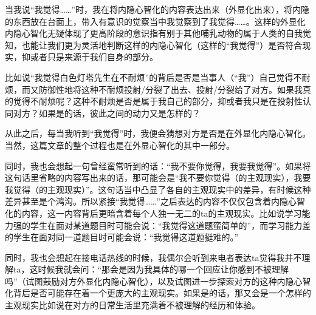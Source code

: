 当我说“我觉得……”时，我在将内隐心智化的内容表达出来（外显化出来），将内隐的东西放在台面上，带入有意识的觉察当中\pozhehao{}我觉察到了我觉得……。这样的外显化内隐心智化无疑体现了更高阶段的意识\pozhehao{}指有别于其他哺乳动物的属于人类的自我觉知，也能让我们更为灵活地判断这样的内隐心智化（这样的“我觉得”）是否符合现实，抑或者只是来源于我们自身的部分。

比如说“我觉得白色灯塔先生在不耐烦”的背后是否是当事人（“我”）自己觉得不耐烦，而又防御性地将这种不耐烦投射/分裂了出去、投射/分裂给了对方。如果我真的觉得不耐烦呢？这种不耐烦是否是属于我自己的部分，抑或者我只是在投射性认同对方？如果是的话，彼此之间的动力又是怎样的？

从此之后，每当我听到“我觉得”时，我便会猜想对方是否是在外显化内隐心智化。当然，这篇文章的整个过程也是在外显心智化的其中一部分。

同时，我也会想起一句曾经蛮常听到的话：“我不要你觉得，我要我觉得”。如果将这句话里省略的内容写出来的话，那可能会是“我不要你觉得（的主观现实），我要我觉得（的主观现实）”。这句话当中凸显了各自的主观现实中的差异，有时候这种差异甚至是个鸿沟。所以紧接“我觉得……”之后表达的内容不仅仅包含着内隐心智化的内容，这一内容背后更暗含着每个人独一无二的ta的主观现实。比如说学习能力强的学生在面对某道题目时可能会说：“我觉得这道题蛮简单的”，而学习能力差的学生在面对同一道题目时可能会说：“我觉得这道题挺难的。”

同时，我也会想起在接电话热线的时候，我偶尔会听到来电者表达ta觉得我并不理解ta，这时候我就会问：“那会是因为我具体的哪一个回应让你感到不被理解吗”（试图鼓励对方外显化内隐心智化），以及试图进一步探索对方的这种内隐心智化背后是否可能存在着一个更庞大的主观现实。如果是的话，那又会是一个怎样的主观现实\pozhehao{}比如说在对方的日常生活里充满着不被理解的经历和体验。


